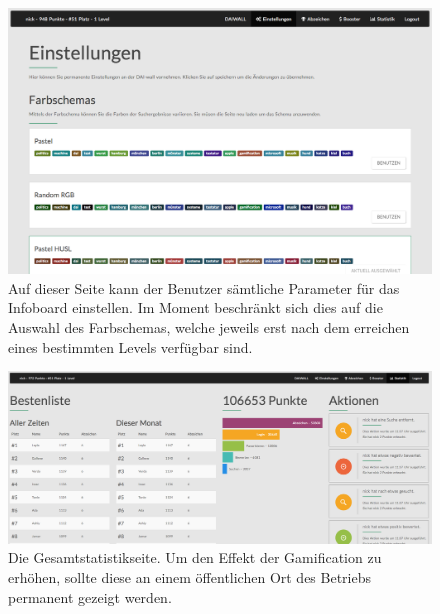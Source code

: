 \documentclass[12pt,twoside]{book}
\begin{document}
\begin{figure}[htbp]
    \centering
    \includegraphics[width=1.0\textwidth]{images/infoboard_settings.png}
    \caption{Auf dieser Seite kann der Benutzer sämtliche Parameter für das Infoboard einstellen. Im Moment beschränkt sich dies auf die Auswahl des Farbschemas, welche jeweils erst nach dem erreichen eines bestimmten Levels verfügbar sind.}
    \label{fig:settings}
\end{figure}


\begin{figure}[htbp]
    \centering
    \includegraphics[width=1.0\textwidth]{images/infoboard_stats.png}
    \caption{Die Gesamtstatistikseite. Um den Effekt der Gamification zu erhöhen, sollte diese an einem öffentlichen Ort des Betriebs permanent gezeigt werden.}
    \label{fig:stats}
\end{figure}
\end{document}
